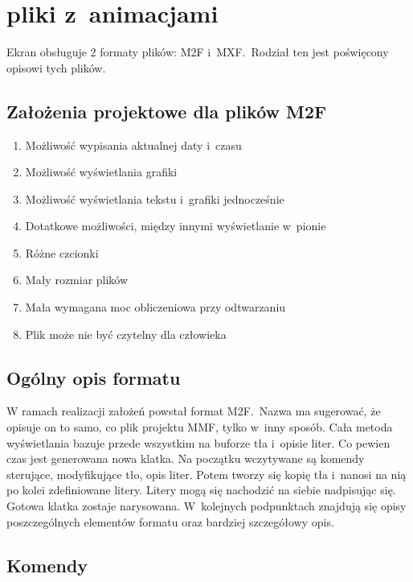 \section{pliki z~animacjami}
Ekran obsługuje 2 formaty plików: M2F i~MXF.~Rodział ten jest poświęcony opisowi tych plików.


\subsection{Założenia projektowe dla plików M2F}
\begin{enumerate}
\item Możliwość wypisania aktualnej daty i~czasu
\item Możliwość wyświetlania grafiki
\item Możliwość wyświetlania tekstu i~grafiki jednocześnie
\item Dotatkowe możliwości, między innymi wyświetlanie w~pionie
\item Różne czcionki
\item Mały rozmiar plików
\item Mała wymagana moc obliczeniowa przy odtwarzaniu
\item Plik może nie być czytelny dla człowieka
\end{enumerate}

\subsection{Ogólny opis formatu}
W ramach realizacji założeń powstał format M2F.~Nazwa ma sugerować, że opisuje on to samo, co plik projektu MMF, tylko w~inny sposób. Cała metoda wyświetlania bazuje przede wszystkim na buforze tła i~opisie liter. Co pewien czas jest generowana nowa klatka. Na początku wczytywane są komendy sterujące, modyfikujące tło, opis liter. Potem tworzy się kopię tła i~nanosi na nią po kolei zdefiniowane litery. Litery mogą się nachodzić na siebie nadpisując się. Gotowa klatka zostaje narysowana. W~kolejnych podpunktach znajdują się opisy poszczególnych elementów formatu oraz bardziej szczegółowy opis.

\subsection{Komendy}
